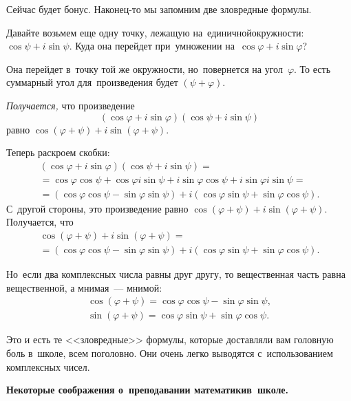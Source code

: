 
Сейчас будет бонус. Наконец-то мы запомним две зловредные формулы.

Давайте возьмем еще одну точку, лежащую на~единичной\linebreak окружности: $\cos\psi+i\sin\psi$.
Куда она перейдет при~умножении на~$\cos\varphi+i\sin\varphi$?

Она перейдет в~точку той же окружности, но~повернется на угол~$\varphi$. То есть суммарный угол для~произведения будет $(\psi+\varphi)$.


\textit{Получается,} что произведение
$$
(\cos\varphi+i\sin\varphi)(\cos\psi+i\sin\psi)
$$
равно $\cos(\varphi+\psi)+i\sin(\varphi+\psi)$.

Теперь раскроем скобки:
\begin{multline*}
(\cos\varphi+i\sin\varphi)(\cos\psi+i\sin\psi)=
\\=
\cos\varphi\cos\psi+\cos\varphi i\sin\psi+i\sin\varphi\cos\psi+i\sin\varphi i\sin\psi=
\\=
(\cos\varphi\cos\psi-\sin\varphi\sin\psi)+i(\cos\varphi\sin\psi+\sin\varphi\cos\psi).
\end{multline*}
С~другой стороны, это произведение равно $\cos(\varphi+\psi)+i\sin(\varphi+\psi)$. Получается, что
\begin{multline*}
\cos(\varphi+\psi)+i\sin(\varphi+\psi)=
\\=
(\cos\varphi\cos\psi-\sin\varphi\sin\psi)+i(\cos\varphi\sin\psi+\sin\varphi\cos\psi).
\end{multline*}

Но~если два комплексных числа равны друг другу, то вещественная часть равна вещественной, а мнимая~--- мнимой:
\begin{gather*}
\cos(\varphi+\psi)=
\cos\varphi\cos\psi-\sin\varphi\sin\psi,\\
\sin(\varphi+\psi)=
\cos\varphi\sin\psi+\sin\varphi\cos\psi.
\end{gather*}

Это и есть те <<зловредные>> формулы, которые доставляли вам головную боль в~школе, всем поголовно. Они очень легко
выводятся с~использованием комплексных чисел.

\textbf{Некоторые соображения о~преподавании математики\linebreak в~школе.}

